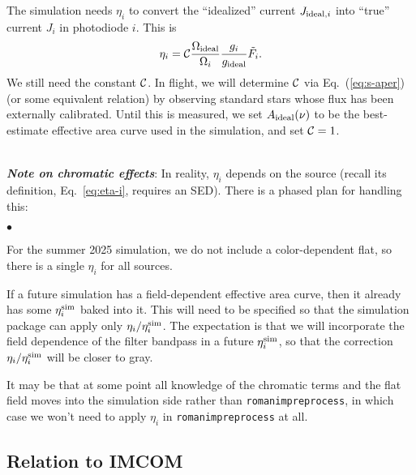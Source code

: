 \documentclass[prd,onecolumn,nofootinbib,nobibnotes]{revtex4}
\begin{document}
The simulation needs $\eta_i$ to convert the ``idealized'' current $J_{{\rm ideal},i}$ into ``true'' current $J_i$ in photodiode $i$. This is
\begin{equation}
\eta_i = {\cal C} \frac{\Omega_{\rm ideal}}{\Omega_i} \frac{g_i}{g_{\rm ideal}} \tilde F_i.
\end{equation}
We still need the constant ${\cal C}$. In flight, we will determine ${\cal C}$ via Eq.~(\ref{eq:s-aper}) (or some equivalent relation) by observing standard stars whose flux has been externally calibrated. Until this is measured, we set $A_{\rm ideal}(\nu)$ to be the best-estimate effective area curve used in the simulation, and set ${\cal C}=1$.

~\\
\noindent
{\slshape\bfseries{Note on chromatic effects}}: In reality, $\eta_i$ depends on the source (recall its definition, Eq.~\ref{eq:eta-i}, requires an SED). There is a phased plan for handling this:
\begin{list}{$\bullet$}{}
\item For the summer 2025 simulation, we do not include a color-dependent flat, so there is a single $\eta_i$ for all sources.
\item If a future simulation has a field-dependent effective area curve, then it already has some $\eta_i^{\rm sim}$ baked into it. This will need to be specified so that the simulation package can apply only $\eta_i/\eta_i^{\rm sim}$. The expectation is that we will incorporate the field dependence of the filter bandpass in a future $\eta_i^{\rm sim}$, so that the correction $\eta_i/\eta_i^{\rm sim}$ will be closer to gray.
\item It may be that at some point all knowledge of the chromatic terms and the flat field moves into the simulation side rather than {\tt romanimpreprocess}, in which case we won't need to apply $\eta_i$ in {\tt romanimpreprocess} at all.
\end{list}

\subsection{Relation to IMCOM}
\end{document}
